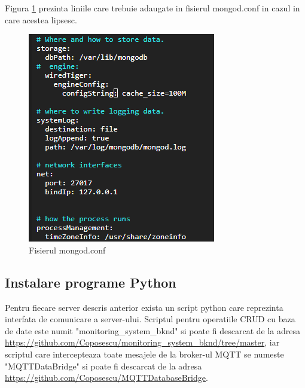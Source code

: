 Figura \ref{fig:iu_mongod_conf} prezinta liniile care trebuie adaugate in fisierul mongod.conf in cazul in care acestea lipsesc.
\begin{figure}[H]
    \centering
    \includegraphics[scale=0.7]{figs/iu_mongod_conf.png}
    \caption{Fisierul mongod.conf}
    \label{fig:iu_mongod_conf}
\end{figure}

\subsection{Instalare programe Python}\label{subsec:iu_instalare_python}
Pentru fiecare server descris anterior exista un script python care reprezinta interfata de comunicare a server-ului. Scriptul pentru operatiile CRUD cu baza de date 
este numit "monitoring\_system\_bknd" si poate fi descarcat de la adresa \url{https://github.com/Coposescu/monitoring\_system\_bknd/tree/master}, iar scriptul 
care intercepteaza toate mesajele de la broker-ul MQTT se numeste "MQTTDataBridge" si poate fi descarcat de la adresa \url{https://github.com/Coposescu/MQTTDatabaseBridge}.

